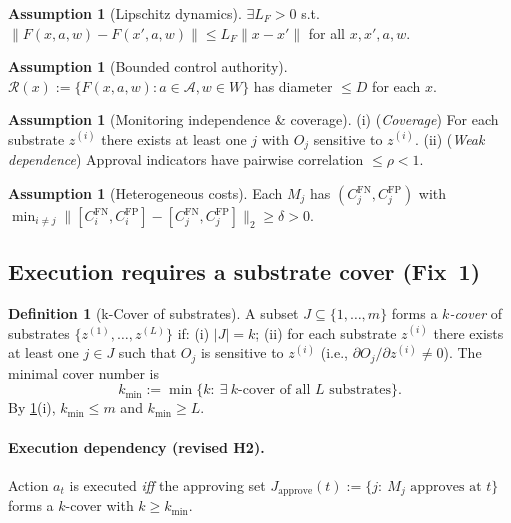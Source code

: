 \documentclass[11pt]{article}
\theoremstyle{definition}
\newtheorem{definition}[theorem]{Definition}
\newtheorem{assumption}[theorem]{Assumption}
\newcommand{\A}{\mathcal{A}}
\newcommand{\1}{\mathbf{1}}
\begin{document}
\begin{assumption}[Lipschitz dynamics]\label{ass:lipsF}
$\exists L_F>0$ s.t. $\|F(x,a,w)-F(x',a,w)\|\le L_F\|x-x'\|$ for all $x,x',a,w$.
\end{assumption}

\begin{assumption}[Bounded control authority]\label{ass:authority}
$\mathcal R(x):=\{F(x,a,w):a\in\A,w\in W\}$ has diameter $\le D$ for each $x$.
\end{assumption}

\begin{assumption}[Monitoring independence \& coverage]\label{ass:indep}
(i) (\emph{Coverage}) For each substrate $z^{(i)}$ there exists at least one $j$ with $O_j$ sensitive to $z^{(i)}$. (ii) (\emph{Weak dependence}) Approval indicators have pairwise correlation $\le \rho<1$.
\end{assumption}

\begin{assumption}[Heterogeneous costs]\label{ass:hetero}
Each $M_j$ has $(C_j^{\mathrm{FN}},C_j^{\mathrm{FP}})$ with $\min_{i\neq j}\|[C_i^{\mathrm{FN}},C_i^{\mathrm{FP}}]-[C_j^{\mathrm{FN}},C_j^{\mathrm{FP}}]\|_2\ge \delta>0$.
\end{assumption}

\subsection{Execution requires a substrate cover (Fix~1)}
\begin{definition}[k-Cover of substrates]\label{def:kcover}
A subset $J\subseteq\{1,\dots,m\}$ forms a \emph{$k$-cover} of substrates $\{z^{(1)},\dots,z^{(L)}\}$ if: (i) $|J|=k$; (ii) for each substrate $z^{(i)}$ there exists at least one $j\in J$ such that $O_j$ is sensitive to $z^{(i)}$ (i.e., $\partial O_j/\partial z^{(i)}\neq 0$). The minimal cover number is
\[
k_{\min}:=\min\{k:\ \exists\ \text{$k$-cover of all }L\text{ substrates}\}.
\]
By \cref{ass:indep}(i), $k_{\min}\le m$ and $k_{\min}\ge L$.
\end{definition}

\paragraph{Execution dependency (revised H2).}
Action $a_t$ is executed \emph{iff} the approving set
$J_{\mathrm{approve}}(t):=\{j:\ M_j\text{ approves at }t\}$ forms a $k$-cover with $k\ge k_{\min}$.
\end{document}
